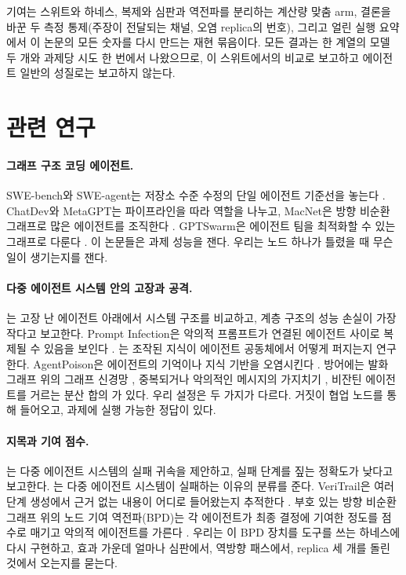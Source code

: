 \documentclass[11pt]{article}
\begin{document}
기여는 스위트와 하네스, 복제와 심판과 역전파를 분리하는 계산량 맞춤 arm, 결론을 바꾼 두 측정 통제(주장이 전달되는 채널, 오염 replica의 번호), 그리고 얼린 실행 요약에서 이 논문의 모든 숫자를 다시 만드는 재현 묶음이다.
모든 결과는 한 계열의 모델 두 개와 과제당 시도 한 번에서 나왔으므로, 이 스위트에서의 비교로 보고하고 에이전트 일반의 성질로는 보고하지 않는다.

\section{관련 연구}

\paragraph{그래프 구조 코딩 에이전트.}
SWE-bench와 SWE-agent는 저장소 수준 수정의 단일 에이전트 기준선을 놓는다 \citep{jimenez2023swebench,yang2024sweagent}.
ChatDev와 MetaGPT는 파이프라인을 따라 역할을 나누고, MacNet은 방향 비순환 그래프로 많은 에이전트를 조직한다 \citep{qian2023chatdev,hong2023metagpt,qian2024macnet}.
GPTSwarm은 에이전트 팀을 최적화할 수 있는 그래프로 다룬다 \citep{zhuge2024gptswarm}.
이 논문들은 과제 성능을 잰다. 우리는 노드 하나가 틀렸을 때 무슨 일이 생기는지를 잰다.

\paragraph{다중 에이전트 시스템 안의 고장과 공격.}
\citet{huang2024resilience}는 고장 난 에이전트 아래에서 시스템 구조를 비교하고, 계층 구조의 성능 손실이 가장 작다고 보고한다.
Prompt Infection은 악의적 프롬프트가 연결된 에이전트 사이로 복제될 수 있음을 보인다 \citep{lee2024promptinfection}. \citet{ju2024flooding}는 조작된 지식이 에이전트 공동체에서 어떻게 퍼지는지 연구한다.
AgentPoison은 에이전트의 기억이나 지식 기반을 오염시킨다 \citep{chen2024agentpoison}.
방어에는 발화 그래프 위의 그래프 신경망 \citep{wang2025gsafeguard}, 중복되거나 악의적인 메시지의 가지치기 \citep{zhang2024cutthecrap}, 비잔틴 에이전트를 거르는 분산 합의 \citep{lee2026byzantine}가 있다.
우리 설정은 두 가지가 다르다. 거짓이 협업 노드를 통해 들어오고, 과제에 실행 가능한 정답이 있다.

\paragraph{지목과 기여 점수.}
\citet{zhang2025failureattribution}는 다중 에이전트 시스템의 실패 귀속을 제안하고, 실패 단계를 짚는 정확도가 낮다고 보고한다.
\citet{cemri2025mast}는 다중 에이전트 시스템이 실패하는 이유의 분류를 준다.
VeriTrail은 여러 단계 생성에서 근거 없는 내용이 어디로 들어왔는지 추적한다 \citep{metropolitansky2025veritrail}.
부호 있는 방향 비순환 그래프 위의 노드 기여 역전파(BPD)는 각 에이전트가 최종 결정에 기여한 정도를 점수로 매기고 악의적 에이전트를 가른다 \citep{wu2025bpd}.
우리는 이 BPD 장치를 도구를 쓰는 하네스에 다시 구현하고, 효과 가운데 얼마나 심판에서, 역방향 패스에서, replica 세 개를 돌린 것에서 오는지를 묻는다.
\end{document}
